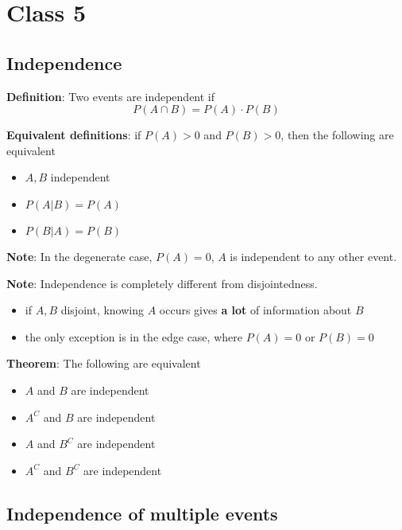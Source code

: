 \chapter{Class 5}
\section{Independence}

 \begin{framed}
    \textbf{Definition}: Two events are independent if 
    \[
      P(A \cap B) = P(A) \cdot P(B)
    \] 

    \textbf{Equivalent definitions}: if $P(A) > 0 $ and  $P(B) > 0$, then the following are equivalent
     \begin{itemize} 
        \item $A, B$ independent
        \item $P(A|B) = P(A)$
        \item $P(B|A) = P(B)$
    \end{itemize}

\textbf{Note}: In the degenerate case, $P(A) = 0$,  $A$ is independent to any other event.

\textbf{Note}: Independence is completely different from disjointedness.
\begin{itemize}
   \item if $A, B$ disjoint, knowing $A$ occurs gives \textbf{ a lot} of information about $B$ 
   \item the only exception is in the edge case, where $P(A) = 0$ or  $P(B) = 0$
\end{itemize}

\end{framed}


\begin{framed}
   \textbf{Theorem}: The following are equivalent 
   \begin{itemize}
      \item $A$ and $B$ are independent
      \item $A^C$ and $B$ are independent
      \item $A$ and $B^C$ are independent
      \item $A^C$ and $B^C$ are independent
   \end{itemize}
\end{framed}

\section{Independence of multiple events}

